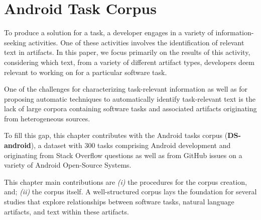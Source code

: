 \setcounter{chapter}{3}
\setcounter{rq}{1}


\chapter{Android Task Corpus}
\label{ch:android-corpus}




To produce a solution for a task, a developer engages in a variety of
information-seeking activities.  One of these activities involves
the identification of relevant text in artifacts. In this
paper, we focus primarily on the results of this activity,
considering which
text, from a variety of different artifact types, developers deem
relevant to working on for a particular software task.


One of the challenges for characterizing task-relevant information as well as for proposing automatic techniques to automatically identify task-relevant text is
the lack of large corpora containing
software tasks and associated artifacts originating from heterogeneous sources.



To fill this gap, this chapter contributes with the Android tasks corpus (\textbf{\acs{DS-android}}), a dataset with 300 tasks comprising Android development and originating from Stack Overflow questions
as well as from GitHub issues on a variety of Android Open-Source Systems.





This chapter main contributions are \textit{(i)} the procedures for the corpus creation, and; \textit{(ii)} the corpus itself. A well-structured corpus lays the foundation for several studies that explore relationships between software tasks, natural language artifacts, and text within these artifacts. 













